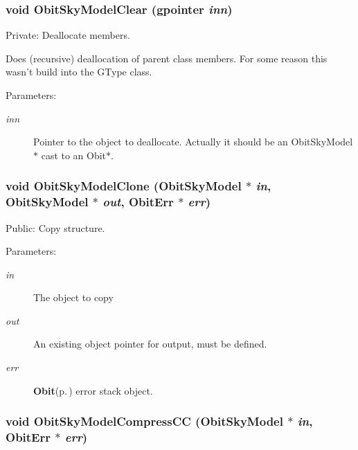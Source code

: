 \subsubsection{\setlength{\rightskip}{0pt plus 5cm}void Obit\-Sky\-Model\-Clear (gpointer {\em inn})}\label{ObitSkyModel_8c_a7}


Private: Deallocate members. 

Does (recursive) deallocation of parent class members. For some reason this wasn't build into the GType class. \begin{Desc}
\item[Parameters:]
\begin{description}
\item[{\em inn}]Pointer to the object to deallocate. Actually it should be an Obit\-Sky\-Model$\ast$ cast to an Obit$\ast$. \end{description}
\end{Desc}
\subsubsection{\setlength{\rightskip}{0pt plus 5cm}void Obit\-Sky\-Model\-Clone ({\bf Obit\-Sky\-Model} $\ast$ {\em in}, {\bf Obit\-Sky\-Model} $\ast$ {\em out}, {\bf Obit\-Err} $\ast$ {\em err})}\label{ObitSkyModel_8c_a17}


Public: Copy structure. 

\begin{Desc}
\item[Parameters:]
\begin{description}
\item[{\em in}]The object to copy \item[{\em out}]An existing object pointer for output, must be defined. \item[{\em err}]{\bf Obit}{\rm (p.\,\pageref{structObit})} error stack object. \end{description}
\end{Desc}
\subsubsection{\setlength{\rightskip}{0pt plus 5cm}void Obit\-Sky\-Model\-Compress\-CC ({\bf Obit\-Sky\-Model} $\ast$ {\em in}, {\bf Obit\-Err} $\ast$ {\em err})}\label{ObitSkyModel_8c_a31}


